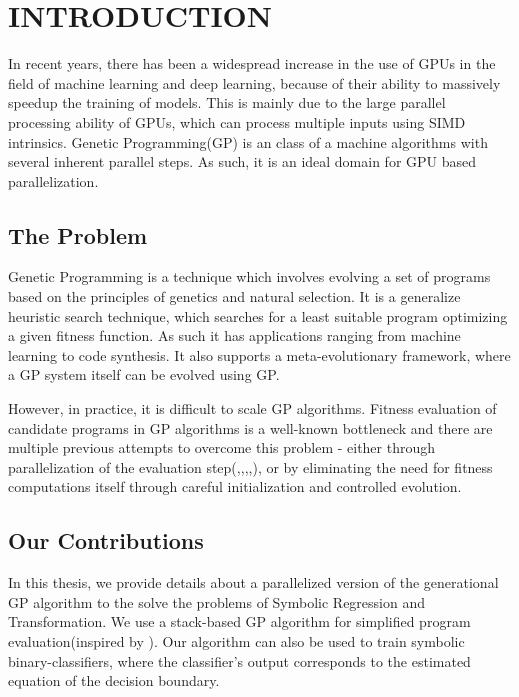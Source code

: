 \chapter{INTRODUCTION} \label{chap:intro}
In recent years, there has been a widespread increase in the use of GPUs in the field of machine learning and deep learning, because of their ability to massively speedup the training of models. This is mainly due to the large parallel processing ability of GPUs, which can process multiple inputs using SIMD intrinsics. Genetic Programming(GP) is an class of a machine algorithms with several inherent parallel steps. As such, it is an ideal domain for GPU based parallelization. 

\section{The Problem}
\label{intro:problem}
Genetic  Programming is a technique which involves evolving a set of programs based on the principles of genetics and natural selection. It is a generalize heuristic search technique, which searches for a least suitable program optimizing a given fitness function. 
As such it has applications ranging from machine learning to code synthesis.\citep{Koza92} It also supports a meta-evolutionary framework, where a GP system itself can be evolved using GP.\citep{schaul2010metalearning}

However, in practice, it is difficult to scale GP algorithms. Fitness evaluation of candidate programs in GP algorithms is a well-known bottleneck and there are multiple previous attempts to overcome this problem - either through parallelization of the evaluation step(\citep{10.1007/978-3-540-71605-1_9},\citep{baeta2021tensorgp},\citep{DEAP_JMLR2012},\citep{gplearn},\citep{staats2017tensorflow}), or by eliminating the need for fitness computations itself through careful initialization and controlled evolution.\citep{biles2001autonomous}

\section{Our Contributions}
\label{intro:contrib} 
In this thesis, we provide details about a parallelized version of the generational GP algorithm to the solve the problems of Symbolic Regression and Transformation. We use a stack-based GP algorithm for simplified program evaluation(inspired by \citep{perkis}). Our algorithm can also be used to train symbolic binary-classifiers, where the classifier's output corresponds to the estimated equation of the decision boundary. 

